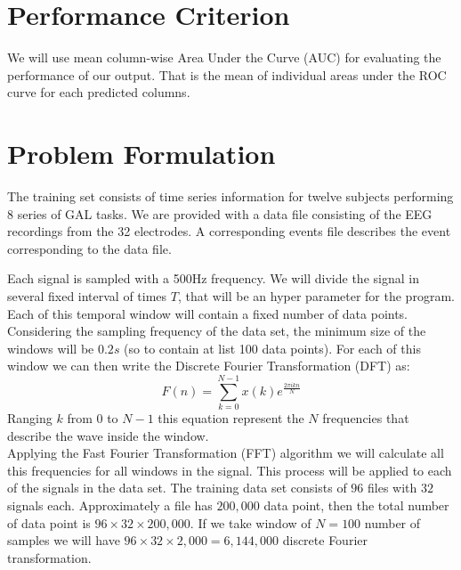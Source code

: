 \documentclass[final,leqno,onefignum,onetabnum]{siamltexmm}
\begin{document}
\section{Performance Criterion}
We will use mean column-wise Area Under the Curve (AUC) for evaluating the performance of our output.  That is the mean of individual areas under the ROC curve for each predicted columns.

\section{Problem Formulation}
The training set consists of time series information for twelve subjects performing 8 series of GAL tasks.  We are provided with a data file consisting of the EEG recordings from the 32 electrodes.  A corresponding events file describes the event corresponding to the data file.

Each signal is sampled with a 500Hz frequency. We will divide the signal in several fixed interval of times $T$, that will be an hyper parameter for the program. Each of this temporal window will contain a fixed number of data points. Considering the sampling frequency of the data set, the minimum size of the windows will be $0.2 s$ (so to contain at list 100 data points). 
For each of this window we can then write the Discrete Fourier Transformation (DFT) as:
\begin{equation}
  \label{DFT}
  F(n) =\sum_{k=0}^{N-1}x(k)e^{\frac{2\pi i kn}{N}}
\end{equation}  
Ranging $k$ from $0$ to $N-1$ this equation represent the $N$ frequencies that describe the wave inside the window.\\
Applying the Fast Fourier Transformation (FFT) algorithm\cite{FFT} we will calculate all this frequencies for all windows in the signal. This process will be applied to each of the signals in the data set. The training data set consists of $96$ files with $32$ signals each. Approximately a file has $200,000$ data point, then the total number of data point is $96\times 32 \times 200,000$. If we take window of $N=100$ number of samples we will have $96\times 32 \times 2,000=6,144,000$ discrete Fourier transformation. 

\end{document}
